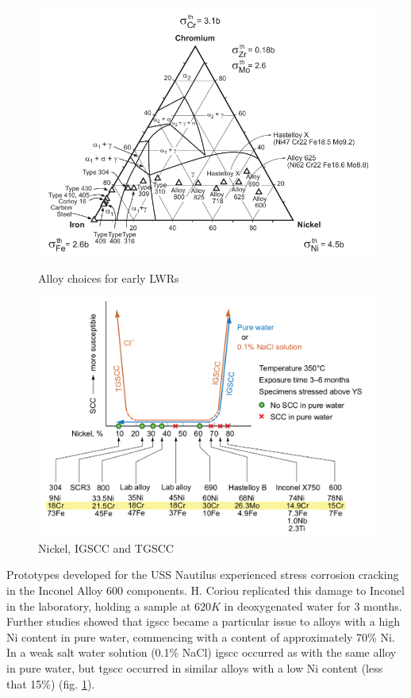 \begin{figure}
\centering
\begin{minipage}{.46\textwidth}
\centering
    \includegraphics[width=.8\linewidth]{chapters/austenitic_steels_in_nuclear/images/fecrnialloys.png}
    \caption{Alloy choices for early LWRs}
    \label{fig:fecrnialloys}
\end{minipage}
\begin{minipage}{.05\textwidth}
\end{minipage}
\begin{minipage}{.46\textwidth}
\centering
    \includegraphics[width=.8\linewidth]{chapters/austenitic_steels_in_nuclear/images/tgscc_igscc_vs_nickel.png}
    \caption{Nickel, IGSCC and TGSCC}
    \label{fig:nitgsccigscc}
\end{minipage}
\end{figure}

Prototypes developed for the USS Nautilus experienced stress corrosion cracking in the Inconel Alloy 600 components.  H. Coriou replicated this damage to Inconel in the laboratory, holding a sample at $620K$ in deoxygenated water for 3 months\cite{staehlecoriou}.  Further studies showed that \acrshort{igscc} became a particular issue to alloys with a high Ni content in pure water, commencing with a content of approximately 70\% Ni.  In a weak salt water solution (0.1\% NaCl) \acrshort{igscc} occurred as with the same alloy in pure water, but \acrshort{tgscc} occurred in similar alloys with a low Ni content (less that 15\%) (fig. \ref{fig:nitgsccigscc}).


